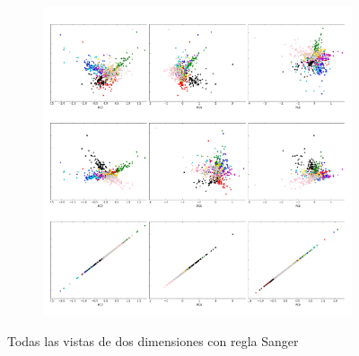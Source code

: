 \begin{figure}[ht!]
	\begin{subfigure}[b]{0.45\textwidth}
		\includegraphics[width=\linewidth]{img/sanger/9dim-COLLAGE5}
	\end{subfigure}%
	\caption{Todas las vistas de dos dimensiones con regla Sanger}
\end{figure}

\newpage

